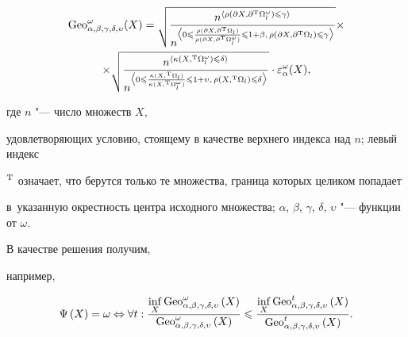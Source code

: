 \begin{multline*}

{\rm Geo}_{\alpha, \beta, \gamma, \delta, \upsilon }^\omega (X)=

\sqrt{

\frac{n^{\langle \rho (\partial X, \partial^{\rm T}\Omega_l^\omega )\leqslant \gamma  \rangle }}

{n^{\bigl\langle

0\leqslant \frac{\rho (\partial X, \partial^{\rm T}\Omega_l  ) }

                {\rho (\partial X, \partial^{\rm T}\Omega_l^\omega ) }

\leqslant 1+\beta,\, \rho (\partial X, \partial{\rm ^T}\Omega _l )\leqslant \gamma

\bigr\rangle }}} \times \\

\times

 \sqrt{

\frac{n^{\langle \kappa (X, {}^{\rm T}\Omega_l^\omega )\leqslant \delta  \rangle }}

{n^{\bigl\langle

0\leqslant \frac{\kappa (X, {}^{\rm T}\Omega_l  ) }

                {\kappa (X, {}^{\rm T}\Omega_l^\omega ) }

\leqslant 1+\upsilon,\, \rho ( X, {}{\rm ^T}\Omega _l )\leqslant \delta

\bigr\rangle }}}

\cdot

\varepsilon _\alpha ^\omega ( X ),

\end{multline*}

где $n$ "--- число множеств $X$,

удовлетворяющих условию, стоящему в качестве верхнего индекса над $n$; левый индекс

${}^{\rm T}$ означает, что берутся только те множества, граница которых целиком попадает

в~указанную окрестность центра исходного множества; $\alpha$, $\beta$, $\gamma$, $\delta$, $\upsilon $ "--- функции от $\omega $.



В качестве решения получим,

например,

\[

\Psi \left( X \right)=\omega \Leftrightarrow \forall t:\frac{  \inf

\limits_X {\rm Geo}_{\alpha ,\beta ,\gamma ,\delta ,\upsilon }^\omega \left( X

\right)}{{\rm Geo}_{\alpha ,\beta ,\gamma ,\delta ,\upsilon }^\omega \left( X

\right)}\leqslant \frac{  \inf \limits_X {\rm Geo}_{\alpha, \beta, \gamma, \delta , \upsilon }^t \left( X \right)}{{\rm Geo}_{\alpha, \beta, \gamma, \delta, \upsilon }^t \left( X \right)} .

\]

